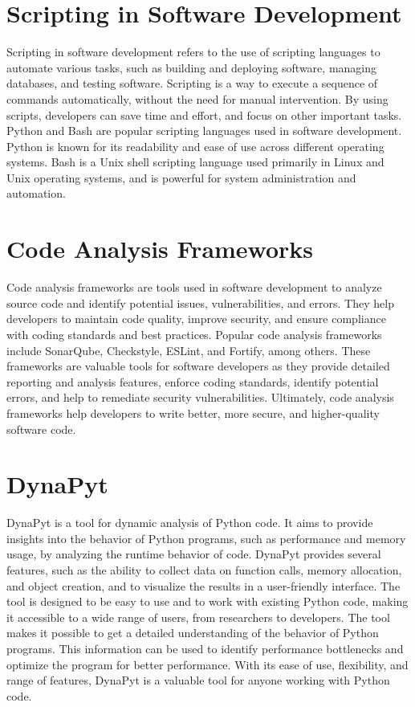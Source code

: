 \section{Scripting in Software Development}
Scripting in software development refers to the use of scripting languages to automate various tasks, such as building and deploying software, managing databases, and testing software.
Scripting is a way to execute a sequence of commands automatically, without the need for manual intervention.
By using scripts, developers can save time and effort, and focus on other important tasks. Python and Bash are popular scripting languages used in software development.
Python is known for its readability and ease of use across different operating systems.
Bash is a Unix shell scripting language used primarily in Linux and Unix operating systems, and is powerful for system administration and automation.

\section{Code Analysis Frameworks}
Code analysis frameworks are tools used in software development to analyze source code and identify potential issues, vulnerabilities, and errors.
They help developers to maintain code quality, improve security, and ensure compliance with coding standards and best practices.
Popular code analysis frameworks include SonarQube, Checkstyle, ESLint, and Fortify, among others.
These frameworks are valuable tools for software developers as they provide detailed reporting and analysis features, enforce coding standards, identify potential errors, and help to remediate security vulnerabilities.
Ultimately, code analysis frameworks help developers to write better, more secure, and higher-quality software code.

\section{DynaPyt}
DynaPyt is a tool for dynamic analysis of Python code.
It aims to provide insights into the behavior of Python programs, such as performance and memory usage, by analyzing the runtime behavior of code.
DynaPyt provides several features, such as the ability to collect data on function calls, memory allocation, and object creation, and to visualize the results in a user-friendly interface.
The tool is designed to be easy to use and to work with existing Python code, making it accessible to a wide range of users, from researchers to developers.
The tool makes it possible to get a detailed understanding of the behavior of Python programs.
This information can be used to identify performance bottlenecks and optimize the program for better performance.
With its ease of use, flexibility, and range of features, DynaPyt is a valuable tool for anyone working with Python code.

